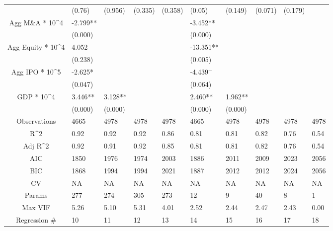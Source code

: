 \documentclass{article}
\begin{document}
\begin{table}[H]
\begin{tabular}{|clllllllll|}
   & (0.76) & (0.956) & (0.335) & (0.358) & (0.05) & (0.149) & (0.071) & (0.179) &  \\ 
  Agg M\&A * 10^4 & -2.799** &  &  &  & -3.452** &  &  &  &  \\ 
   & (0.000) &  &  &  & (0.000) &  &  &  &  \\ 
  Agg Equity * 10^4 & 4.052 &  &  &  & -13.351** &  &  &  &  \\ 
   & (0.238) &  &  &  & (0.005) &  &  &  &  \\ 
  Agg IPO * 10^5 & -2.625* &  &  &  & -4.439$^{+}$ &  &  &  &  \\ 
   & (0.047) &  &  &  & (0.064) &  &  &  &  \\ 
  GDP * 10^4 & 3.446** & 3.128** &  &  & 2.460** & 1.962** &  &  &  \\ 
   & (0.000) & (0.000) &  &  & (0.000) & (0.000) &  &  &  \\ 
  \hline 
 Observations & 4665 & 4978 & 4978 & 4978 & 4665 & 4978 & 4978 & 4978 & 4978 \\ 
  R^2 & 0.92 & 0.92 & 0.92 & 0.86 & 0.81 & 0.81 & 0.82 & 0.76 & 0.54 \\ 
  Adj R^2 & 0.92 & 0.91 & 0.92 & 0.85 & 0.81 & 0.81 & 0.82 & 0.76 & 0.54 \\ 
  AIC & 1850 & 1976 & 1974 & 2003 & 1886 & 2011 & 2009 & 2023 & 2056 \\ 
  BIC & 1868 & 1994 & 1994 & 2021 & 1887 & 2012 & 2012 & 2024 & 2056 \\ 
  CV & NA & NA & NA & NA & NA & NA & NA & NA & NA \\ 
  Params & 277 & 274 & 305 & 273 & 12 & 9 & 40 & 8 & 1 \\ 
  Max VIF & 5.26 & 5.10 & 5.31 & 4.01 & 2.52 & 2.44 & 2.47 & 2.43 & 0.00 \\ 
  Regression \# & 10 & 11 & 12 & 13 & 14 & 15 & 16 & 17 & 18 \\ 
   \hline
\end{tabular}
 
\end{table}
\end{document}
